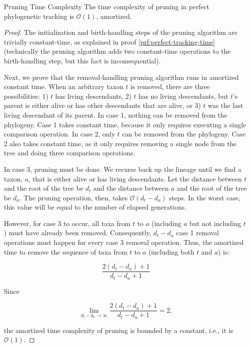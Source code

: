 \begin{theorem}{Pruning Time Complexity}
\label{thm:perfect-tracking-with-pruning-time}
The time complexity of pruning in perfect phylogenetic tracking is $\mathcal{O}(1)$, amortized. 
\end{theorem}

\begin{proof}
\label{prf:perfect-tracking-with-pruning-time}
The initialization and birth-handling steps of the pruning algorithm are trivially constant-time, as explained in proof \ref{prf:perfect-tracking-time} (technically the pruning algorithm adds two constant-time operations to the birth-handling step, but this fact is inconsequential).

Next, we prove that the removal-handling pruning algorithm runs in amortized constant time.
When an arbitrary taxon $t$ is removed, there are three possibilities: 1) $t$ has living descendants, 2) $t$ has no living descendants, but $t$'s parent is either alive or has other descendants that are alive, or 3) $t$ was the last living descendant of its parent.
In case 1, nothing can be removed from the phylogeny.
Case 1 takes constant time, because it only requires executing a single comparison operation.
In case 2, only $t$ can be removed from the phylogeny.
Case 2 also takes constant time, as it only requires removing a single node from the tree and doing three comparison operations.

In case 3, pruning must be done.
We recurse back up the lineage until we find a taxon, $a$, that is either alive or has living descendants. 
Let the distance between $t$ and the root of the tree be $d_t$ and the distance between $a$ and the root of the tree be $d_a$.
The pruning operation, then, takes $\mathcal{O}(d_t - d_a)$ steps. 
In the worst case, this value will be equal to the number of elapsed generations.

However, for case 3 to occur, all taxa from $t$ to $a$ (including $a$ but not including $t$) must have already been removed.
Consequently, $d_t - d_a$ case 1 removal operations must happen for every case 3 removal operation.
Thus, the amortized time to remove the sequence of taxa from $t$ to $a$ (including both $t$ and $a$) is:

\[
\frac{2(d_t - d_a) + 1}{d_t - d_a + 1}
\]

Since

\[
\lim_{d_t - d_a\to\infty} \frac{2(d_t - d_a) + 1}{d_t - d_a + 1} = 2,
\]

the amortized time complexity of pruning is bounded by a constant, i.e., it is $\mathcal{O}(1)$.


\end{proof}

